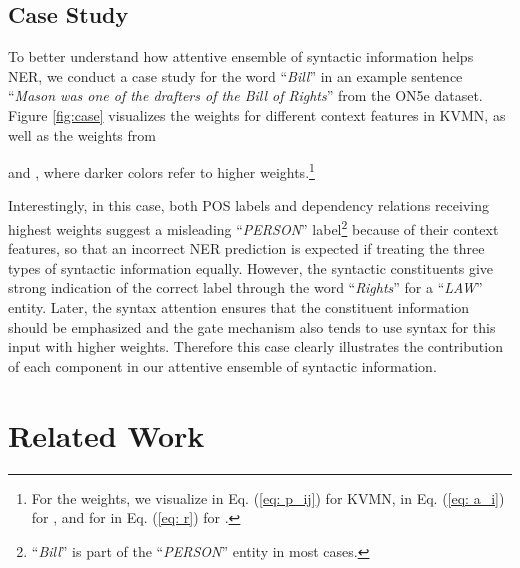 \documentclass[11pt,a4paper]{article}
\begin{document}
\subsection{Case Study}



To better understand how attentive ensemble of syntactic information
helps NER, we conduct a case study for the word ``\textit{Bill}'' in an example sentence ``\textit{Mason was one of the drafters of the Bill of Rights}'' from the ON5e dataset.
Figure \ref{fig:case} visualizes the weights for different context features in KVMN,
as well as the weights from

and ,
where darker colors refer to higher weights.\footnote{For the weights, we visualize  in Eq. (\ref{eq: p_ij}) for KVMN,  in Eq. (\ref{eq: a_i}) for , and  for  in Eq. (\ref{eq: r}) for .}



Interestingly,
in this case,
both POS labels and dependency relations receiving highest weights suggest a misleading ``\textit{PERSON}'' label\footnote{``\textit{Bill}'' is part of the ``\textit{PERSON}'' entity in most cases.} because of their context features,
so that an incorrect NER prediction is expected if treating
the three types of syntactic information equally.
However, the syntactic constituents give strong indication of the correct label through the word ``\textit{Rights}'' for a ``\textit{LAW}'' entity.
Later,
the syntax attention ensures that the constituent information should be emphasized and the gate mechanism also tends to use syntax for this input with higher weights.
Therefore this case clearly illustrates the contribution of each component in our attentive ensemble of syntactic information.









\section{Related Work}
\label{relate}
\end{document}
